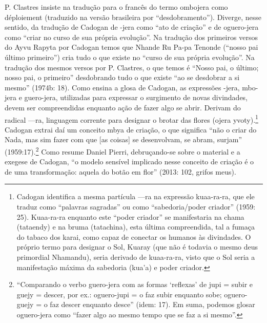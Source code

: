 \documentclass{article}
\begin{document}
P. Clastres insiste na tradu\c{c}\~ao para o franc\^es do termo ombojera
como d\'eploiement (traduzido na vers\~ao brasileira por
{\textquotedblleft}desdobramento{\textquotedblright}). Diverge, nesse
sentido, da tradu\c{c}\~ao de Cadogan de {}-jera como
{\textquotedblleft}ato de cria\c{c}\~ao{\textquotedblright} e de
oguero-jera como {\textquotedblleft}criar no curso de sua pr\'opria
evolu\c{c}\~ao{\textquotedblright}. Na tradu\c{c}\~ao dos primeiros
versos do Ayvu Rapyta por Cadogan temos que Nhande Ru Pa-pa Tenonde
({\textquotedblleft}nosso pai \'ultimo primeiro{\textquotedblright})
cria tudo o que existe no {\textquotedblleft}curso de sua pr\'opria
evolu\c{c}\~ao{\textquotedblright}. Na tradu\c{c}\~ao dos mesmos versos
por P. Clastres, o que temos \'e {\textquotedblleft}Nosso pai, o
\'ultimo; nosso pai, o primeiro{\textquotedblright} desdobrando tudo o
que existe {\textquotedblleft}ao se desdobrar a si
mesmo{\textquotedblright} (1974b: 18). Como ensina a glosa de Cadogan,
as express\~oes -jera, mbo-jera e guero-jera, utilizadas para expressar
o surgimento de novas divindades, devem ser compreendidas enquanto
a\c{c}\~ao de fazer algo se abrir. Derivam do radical ---ra, linguagem
corrente para designar o brotar das flores (ojera yvoty).\footnote{
Cadogan identifica a mesma part\'icula {}---ra na express\~ao
kuaa-ra-ra, que ele traduz como {\textquotedblleft}palavras
sagradas{\textquotedblright} ou como {\textquotedblleft}sabedoria/poder
criador{\textquotedblright} (1959: 25). Kuaa-ra-ra enquanto este
{\textquotedblleft}poder criador{\textquotedblright} se manifestaria na
chama (tataendy) e na bruma (tatachina), esta \'ultima compreendida,
tal a fuma\c{c}a do tabaco dos karai, como capaz de conectar os humanos
\`as divindades. O pr\'oprio termo para designar o Sol, Kuaray (que
n\~ao \'e todavia o mesmo deus primordial Nhamandu), seria derivado de
kuaa-ra-ra, visto que o Sol seria a manifesta\c{c}\~ao m\'axima da
sabedoria (kua{\textquoteright}a) e poder criador.  } Cadogan extrai
da\'i um conceito mbya de cria\c{c}\~ao, o que significa
{\textquotedblleft}n\~ao o criar do Nada, mas sim fazer com que [as
coisas] se desenvolvam, se abram, surjam{\textquotedblright}
(1959:17).\footnote{ {\textquotedblleft}Comparando o verbo guero-jera
com as formas {\textquoteleft}reflexas{\textquoteright} de jupi = subir
e guejy = descer, por ex.: oguero-jupi = o faz subir enquanto sobe;
oguero-guejy = o faz descer enquanto desce{\textquotedblright} (idem:
17). Em suma, podemos glosar oguero-jera como {\textquotedblleft}fazer
algo ao mesmo tempo que se faz a si mesmo{\textquotedblright}.} Como
resume Daniel Pierri, debru\c{c}ando-se sobre o material e a exegese de
Cadogan, {\textquotedblleft}o modelo sens\'ivel implicado nesse
conceito de cria\c{c}\~ao \'e o de uma transforma\c{c}\~ao: aquela do
bot\~ao em flor{\textquotedblright} (2013: 102,  grifos meus). 
\end{document}

